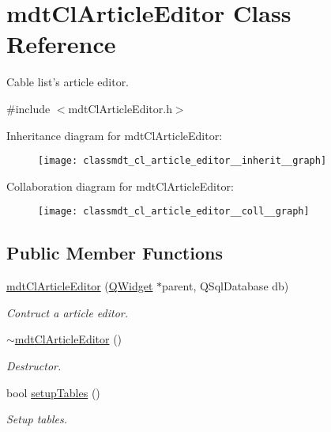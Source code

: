 \hypertarget{classmdt_cl_article_editor}{\section{mdt\-Cl\-Article\-Editor Class Reference}
\label{classmdt_cl_article_editor}
}


Cable list's article editor.  




{\ttfamily \#include $<$mdt\-Cl\-Article\-Editor.\-h$>$}



Inheritance diagram for mdt\-Cl\-Article\-Editor\-:\nopagebreak
\begin{figure}[H]
\begin{center}
\leavevmode
\texttt{[image: classmdt\_cl\_article\_editor\_\_inherit\_\_graph]}
\end{center}
\end{figure}


Collaboration diagram for mdt\-Cl\-Article\-Editor\-:\nopagebreak
\begin{figure}[H]
\begin{center}
\leavevmode
\texttt{[image: classmdt\_cl\_article\_editor\_\_coll\_\_graph]}
\end{center}
\end{figure}
\subsection*{Public Member Functions}
\begin{DoxyCompactItemize}
\item 
\hyperlink{classmdt_cl_article_editor_a8a6cf44604c566c3b2dba07a7ecff220}{mdt\-Cl\-Article\-Editor} (\hyperlink{class_q_widget}{Q\-Widget} $\ast$parent, Q\-Sql\-Database db)
\begin{DoxyCompactList}\small\item\em Contruct a article editor. \end{DoxyCompactList}\item 
\hyperlink{classmdt_cl_article_editor_aaa9680ea0c9f0853992c2325cfbd0581}{$\sim$mdt\-Cl\-Article\-Editor} ()
\begin{DoxyCompactList}\small\item\em Destructor. \end{DoxyCompactList}\item 
bool \hyperlink{classmdt_cl_article_editor_aded93cdb635e69fdba0f8b59054c8fce}{setup\-Tables} ()
\begin{DoxyCompactList}\small\item\em Setup tables. \end{DoxyCompactList}\end{DoxyCompactItemize}
